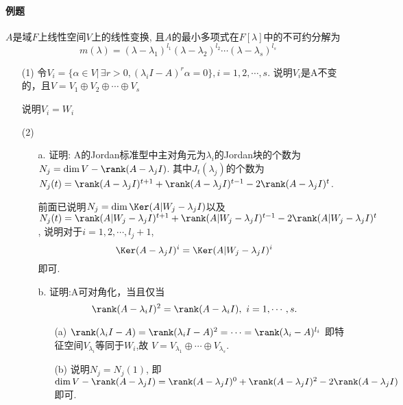 \paragraph{例题}
$A$是域$F$上线性空间$V$上的线性变换, 且$A$的最小多项式在$F[\lambda]$中的不可约分解为
$$m(\lambda) = (\lambda-\lambda_1)^{l_1}(\lambda-\lambda_2)^{l_2}\cdots(\lambda-\lambda_s)^{l_s}$$
\begin{itemize}
\item[(1)] 令$V_i = \{\alpha \in V |\,\exists r > 0,
(\lambda_i I - A)^r \alpha = 0\}, i = 1,2,\cdots,s.$
说明$V_i$是A不变的，且$V = V_1 \oplus V_2 \oplus \cdots \oplus V_s$ 
\begin{solution}
说明$V_i = W_i$
\end{solution}
\item[(2)] 
\begin{itemize}
    \item[a.] 证明: A的Jordan标准型中主对角元为$\lambda_i$的Jordan块的个数为
    $N_j = \dim V - \rank (A - \lambda_j I)$.
    其中$J_t(\lambda_j)$的个数为$N_j(t) = \rank (A-\lambda_j I)^{t+1} +
    \rank (A-\lambda_j I)^{t-1} - 2\rank (A-\lambda_j I)^t$.

    \begin{solution}
        前面已说明$N_j = \dim \Ker (A|W_j - \lambda_j I)$以及
        $N_j(t) = \rank (A|W_j-\lambda_j I)^{t+1} +
        \rank (A|W_j-\lambda_j I)^{t-1} - 2\rank (A|W_j-\lambda_j I)^t$,
        说明对于$i=1,2,\cdots, l_j+1$,
        $$\Ker (A-\lambda_j I)^i = \Ker(A|W_j - \lambda_j I)^i$$即可.
    \end{solution}

    \item[b.] 证明:A可对角化，当且仅当$$ \rank (A - \lambda_iI)^2 = 
    \rank (A - \lambda_iI),\ i=1,\cdots,s. $$ 
    \begin{solution}
    \begin{itemize}
        \item [(a)]
        $\rank(\lambda_iI - A) = \rank(\lambda_i I - A)^2 =\cdots =\rank(\lambda_i - A)^{l_i}$
        即特征空间$V_{\lambda_i}$等同于$W_i$,故 
        $V = V_{\lambda_1} \oplus \cdots \oplus V_{\lambda_s}.$
        \item [(b)] 说明$N_j = N_j(1)$, 即$\dim V - \rank(A-\lambda_j I) = 
        \rank(A-\lambda_j I)^0 + \rank(A-\lambda_j I)^2 - 2\rank(A-\lambda_j I)$即可.
    \end{itemize}
    \end{solution}
\end{itemize}


\end{itemize}
